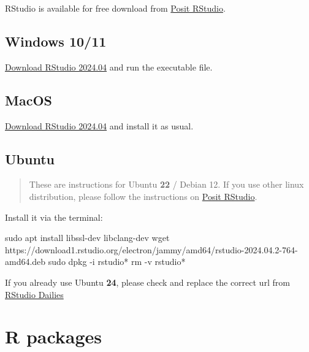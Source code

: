 \documentclass[
  letterpaper,
  DIV=11,
  numbers=noendperiod]{scrreprt}
\newenvironment{Shaded}{\begin{snugshade}}{\end{snugshade}}
\newcommand{\AttributeTok}[1]{\textcolor[rgb]{0.40,0.45,0.13}{#1}}
\newcommand{\FunctionTok}[1]{\textcolor[rgb]{0.28,0.35,0.67}{#1}}
\newcommand{\NormalTok}[1]{\textcolor[rgb]{0.00,0.23,0.31}{#1}}
\newcommand{\PreprocessorTok}[1]{\textcolor[rgb]{0.68,0.00,0.00}{#1}}
\begin{document}
RStudio is available for free download from
\href{https://posit.co/download/rstudio-desktop/}{Posit RStudio}.

\subsection{Windows 10/11}

\href{https://download1.rstudio.org/electron/windows/RStudio-2024.04.2-764.exe}{Download
RStudio 2024.04} and run the executable file.

\subsection{MacOS}

\href{https://download1.rstudio.org/electron/macos/RStudio-2024.04.2-764.dmg}{Download
RStudio 2024.04} and install it as usual.

\subsection{Ubuntu}

\begin{quote}
These are instructions for Ubuntu \textbf{22} / Debian 12. If you use
other linux distribution, please follow the instructions on
\href{https://posit.co/download/rstudio-desktop/}{Posit RStudio}.
\end{quote}

Install it via the terminal:

\begin{Shaded}
\begin{Highlighting}[]
\FunctionTok{sudo}\NormalTok{ apt install libssl{-}dev libclang{-}dev}
\FunctionTok{wget}\NormalTok{ https://download1.rstudio.org/electron/jammy/amd64/rstudio{-}2024.04.2{-}764{-}amd64.deb}
\FunctionTok{sudo}\NormalTok{ dpkg }\AttributeTok{{-}i}\NormalTok{ rstudio}\PreprocessorTok{*}
\FunctionTok{rm} \AttributeTok{{-}v}\NormalTok{ rstudio}\PreprocessorTok{*}
\end{Highlighting}
\end{Shaded}

If you already use Ubuntu \textbf{24}, please check and replace the
correct url from \href{https://dailies.rstudio.com/}{RStudio Dailies}

\section{R packages}\label{r-packages}
\end{document}
